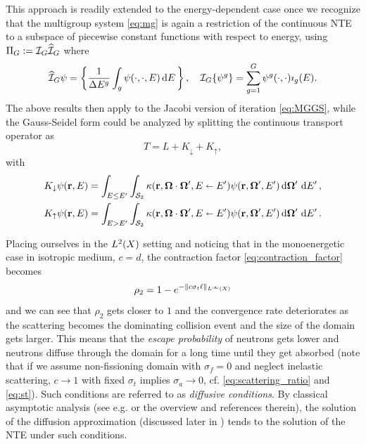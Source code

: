 \begin{remark}\label{rem:MG}
	This approach is readily extended to the energy-dependent case once we recognize that the multigroup system
	\eqref{eq:mg} is again a restriction of the continuous NTE to a subspace of piecewise constant functions with respect
	to energy, using $\Projop[G] := \PiG\PihG$ where
	$$
		\PihG\psi = \left\{\frac{1}{\Delta E^{g}}\int_{g}\psi(\cdot,\cdot,E)\,\d{E}\right\},\quad
		\PiG\{\psi^g\} = \sum_{g=1}^G \psi^g(\cdot,\cdot)\imath_g(E).
	$$
	The above results then apply to the Jacobi version of iteration \eqref{eq:MGGS}, while the Gauss-Seidel form
	could be analyzed by splitting the continuous transport operator as 
	$$
		T = L + K_\downarrow + K_\uparrow,
	$$
	with
	$$
	\begin{aligned}
		K_\downarrow\psi(\br,E) &= \intE[']{E \leq E'}{}{
		\intA[']{\kappa(\br,\bomega\cdot\bomega',E\sla E')\psi(\br,\bomega',E')}},\\
		K_\uparrow\psi(\br,E) &= \intE[']{E > E'}{}{
		\intA[']{\kappa(\br,\bomega\cdot\bomega',E\sla E')\psi(\br,\bomega',E')}}.
	\end{aligned}
	$$
\end{remark}

Placing ourselves in the $\Lp[2](X)$ setting and noticing that in the
monoenergetic case in isotropic medium, $c = d$, the contraction factor \eqref{eq:contraction_factor} becomes
$$
	\rho_2 = 1 - e^{-\norm[{\Lp[\infty](X)}]{c\sigma_t\ell}}
$$
and we can see that $\rho_2$ gets closer to $1$ and the convergence rate deteriorates as the scattering becomes the
dominating collision event and the size of the domain gets larger. This means that the \textit{escape probability} of neutrons gets lower and neutrons diffuse
through the domain for a long time until they get absorbed (note that if we assume non-fissioning domain with $\sigma_f
= 0$ and neglect inelastic scattering, $c \to 1$ with fixed $\sigma_t$ implies $\sigma_a \to 0$, cf.
\eqref{eq:scattering_ratio} and \eqref{eq:st}). Such conditions
are referred to as \textit{diffusive conditions}. By classical asymptotic analysis (see e.g.
\cite{Larsen1} or the overview \cite{AdamsIdea} and references therein), the solution of the diffusion approximation (discussed
later in ) tends to the solution of the NTE under such conditions. 

